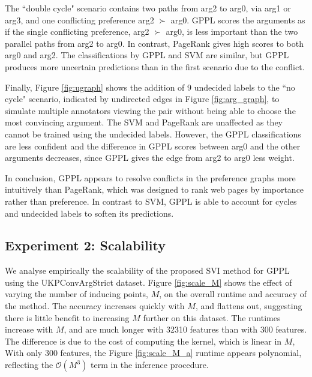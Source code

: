 The ``double cycle" scenario contains two paths from arg2 to arg0, via arg1 or arg3, and one conflicting
preference arg2 $\succ$ arg0. 
GPPL scores the arguments as if the single conflicting preference, arg2 $\succ$ arg0, 
is less important than the two parallel paths from arg2 to arg0. 
In contrast, PageRank gives high scores to both arg0 and arg2.
The classifications by GPPL and SVM are similar, but GPPL produces more uncertain 
predictions than in the first scenario due to the conflict.

Finally,  Figure \ref{fig:ugraph} shows the addition of $9$ undecided labels to the ``no cycle" scenario, indicated by 
undirected edges in Figure \ref{fig:arg_graph}, to simulate multiple annotators viewing the pair without being able to choose the most convincing argument.
The SVM and PageRank are unaffected as they cannot be trained using the undecided labels.
However, the GPPL classifications are less confident and the difference in GPPL scores between arg0 and the other arguments decreases, since GPPL gives the edge from arg2 to arg0 less weight.

In conclusion, GPPL appears to resolve conflicts in the preference graphs
more intuitively than PageRank, which was designed to rank web pages by 
importance rather than preference. 
In contrast to SVM, GPPL is able to account for cycles and undecided labels to soften its predictions.

\subsection{Experiment 2: Scalability}

We analyse empirically the scalability of the proposed SVI method for GPPL using the UKPConvArgStrict dataset.
Figure \ref{fig:scale_M} shows the effect of varying the number of inducing points, $M$, on the overall runtime and accuracy of the method. The accuracy increases quickly with $M$, and flattens out, suggesting there is little benefit to increasing  $M$ further on this dataset. 
The runtimes increase with $M$,  and are much longer with 32310 features than with 300 features.
The difference is due to the cost of computing the kernel, which is linear in $M$,
With only $300$ features, the Figure \ref{fig:scale_M_a} runtime appears polynomial, reflecting the 
$\mathcal{O}(M^3)$ term in the inference procedure. 

